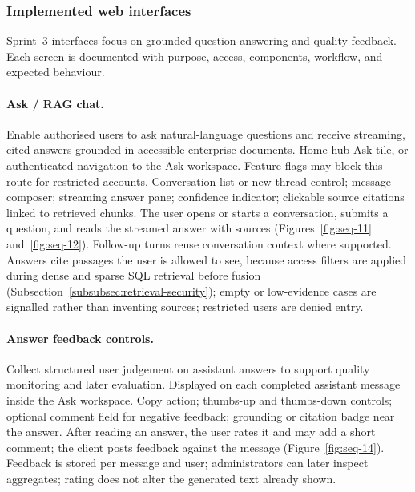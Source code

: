 \subsubsection{Implemented web interfaces}
\label{subsubsec:impl-s3-ui}

Sprint~3 interfaces focus on grounded question answering and quality feedback.
Each screen is documented with purpose, access, components, workflow, and
expected behaviour.

\paragraph{Ask / RAG chat.}
\uiexplain
{Enable authorised users to ask natural-language questions and receive
streaming, cited answers grounded in accessible enterprise documents.}
{Home hub Ask tile, or authenticated navigation to the Ask workspace. Feature
flags may block this route for restricted accounts.}
{Conversation list or new-thread control; message composer; streaming answer
pane; confidence indicator; clickable source citations linked to retrieved
chunks.}
{The user opens or starts a conversation, submits a question, and reads the
streamed answer with sources (Figures~\ref{fig:seq-11} and~\ref{fig:seq-12}).
Follow-up turns reuse conversation context where supported.}
{Answers cite passages the user is allowed to see, because access filters are
applied during dense and sparse SQL retrieval before fusion
(Subsection~\ref{subsubsec:retrieval-security}); empty or low-evidence cases
are signalled rather than inventing sources; restricted users are denied entry.}

\paragraph{Answer feedback controls.}
\uiexplain
{Collect structured user judgement on assistant answers to support quality
monitoring and later evaluation.}
{Displayed on each completed assistant message inside the Ask workspace.}
{Copy action; thumbs-up and thumbs-down controls; optional comment field for
negative feedback; grounding or citation badge near the answer.}
{After reading an answer, the user rates it and may add a short comment; the
client posts feedback against the message (Figure~\ref{fig:seq-14}).}
{Feedback is stored per message and user; administrators can later inspect
aggregates; rating does not alter the generated text already shown.}
